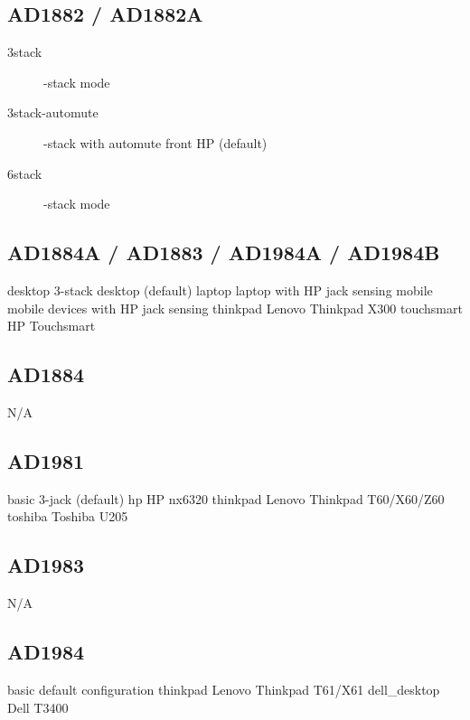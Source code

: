 \documentclass[a4paper,8pt,english]{sphinxmanual}
\begin{document}
\subsection{AD1882 / AD1882A}
\label{sound/hd-audio/models:ad1882-ad1882a}\begin{description}
\item[{3stack}] -stack mode

\item[{3stack-automute}] -stack with automute front HP (default)

\item[{6stack}] -stack mode

\end{description}


\subsection{AD1884A / AD1883 / AD1984A / AD1984B}
\label{sound/hd-audio/models:ad1884a-ad1883-ad1984a-ad1984b}
desktop 3-stack desktop (default)
laptop  laptop with HP jack sensing
mobile  mobile devices with HP jack sensing
thinkpad        Lenovo Thinkpad X300
touchsmart      HP Touchsmart


\subsection{AD1884}
\label{sound/hd-audio/models:ad1884}
N/A


\subsection{AD1981}
\label{sound/hd-audio/models:ad1981}
basic           3-jack (default)
hp              HP nx6320
thinkpad        Lenovo Thinkpad T60/X60/Z60
toshiba Toshiba U205


\subsection{AD1983}
\label{sound/hd-audio/models:ad1983}
N/A


\subsection{AD1984}
\label{sound/hd-audio/models:ad1984}
basic           default configuration
thinkpad        Lenovo Thinkpad T61/X61
dell\_desktop    Dell T3400
\end{document}
